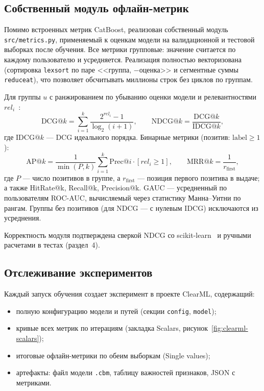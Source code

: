 \subsection{Собственный модуль офлайн-метрик}

Помимо встроенных метрик CatBoost, реализован собственный модуль \texttt{src/metrics.py}, применяемый к оценкам модели на валидационной и тестовой выборках после обучения.
Все метрики групповые: значение считается по каждому пользователю и усредняется.
Реализация полностью векторизована (сортировка \texttt{lexsort} по паре <<группа, $-$оценка>> и сегментные суммы \texttt{reduceat}), что позволяет обсчитывать миллионы строк без циклов по группам.

Для группы $u$ с ранжированием по убыванию оценки модели и релевантностями $rel_i$~\cite{ndcg}:
\begin{equation}
\text{DCG@}k = \sum_{i=1}^{k} \frac{2^{rel_i} - 1}{\log_2(i+1)}, \qquad
\text{NDCG@}k = \frac{\text{DCG@}k}{\text{IDCG@}k},
\end{equation}
где $\text{IDCG@}k$ --- DCG идеального порядка.
Бинарные метрики (позитив: $\text{label} \ge 1$):
\begin{equation}
\text{AP@}k = \frac{1}{\min(P, k)} \sum_{i=1}^{k} \text{Prec@}i \cdot [rel_i \ge 1], \qquad
\text{MRR@}k = \frac{1}{r_{\text{first}}},
\end{equation}
где $P$ --- число позитивов в группе, а $r_{\text{first}}$ --- позиция первого позитива в выдаче; а также HitRate@k, Recall@k, Precision@k.
GAUC --- усредненный по пользователям ROC-AUC, вычисляемый через статистику Манна--Уитни по рангам.
Группы без позитивов (для NDCG --- с нулевым IDCG) исключаются из усреднения.

Корректность модуля подтверждена сверкой NDCG со scikit-learn~\cite{sklearn-docs} и ручными расчетами в тестах (раздел~4).

\subsection{Отслеживание экспериментов}

Каждый запуск обучения создает эксперимент в проекте ClearML, содержащий:
\begin{itemize}
    \item полную конфигурацию модели и путей (секции \texttt{config}, \texttt{model});
    \item кривые всех метрик по итерациям (закладка Scalars, рисунок~\ref{fig:clearml-scalars});
    \item итоговые офлайн-метрики по обеим выборкам (Single values);
    \item артефакты: файл модели \texttt{.cbm}, таблицу важностей признаков, JSON с метриками.
\end{itemize}


